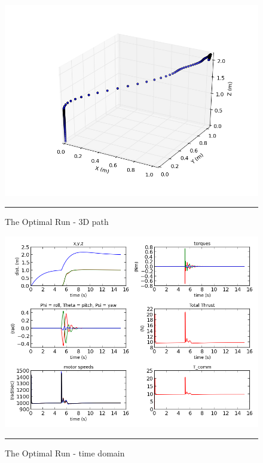 \begin{figure}[htbp]
	\centering
		\includegraphics[width=\textwidth]{Figures/optimal_run_3D_path.png}
		\rule{35em}{0.5pt}
	\caption[Optimal Run 3D Path]{The Optimal Run - 3D path}
	\label{fig:optimal run 3D path}
\end{figure}


\begin{figure}[htbp]
	\centering
		\includegraphics[width=\textwidth]{Figures/optimal_run_time_domain.png}
		\rule{35em}{0.5pt}
	\caption[Optimal Run Time Domain]{The Optimal Run - time domain}
	\label{fig:optimal run time domain}
\end{figure}



